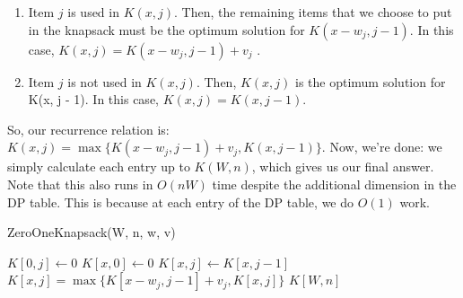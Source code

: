 \documentclass [12pt]{article}
\theoremstyle{definition}
\begin{document}
\begin{enumerate}
  \item Item $j$ is used in $K(x, j)$. Then, the remaining items that we choose to put in the knapsack must be the optimum solution for $K(x - w_j , j - 1)$. In this case, $K(x, j) = K(x - w_j , j - 1) + v_j$ .
  \item Item $j$ is not used in $K(x, j)$. Then, $K(x, j)$ is the optimum solution for K(x, j - 1). In this case, $K(x, j) = K(x, j - 1)$.
\end{enumerate}

So, our recurrence relation is: $K(x, j) = \max\{K(x -w_j , j -1) +v_j , K(x, j -1)\}$. Now, we’re done: we simply calculate each entry up to $K(W, n)$, which gives us our final answer. Note that this also runs in $O(nW)$ time despite the additional dimension in the DP table. This is because at each entry of the DP table, we do $O(1)$ work.

\begin{algorithm}
\caption{ZeroOneKnapsack(W, n, w, v)}
\label{alg:zerooneknapsack}
\begin{algorithmic}
  \STATE $K[0,j] \gets 0$
\ENDFOR
{}
  \STATE $K[x, 0] \gets 0$
\ENDFOR
{}
    \STATE $K[x, j] \gets K[x, j-1]$
      \STATE $K[x, j] = \max\{K[x - w_j, j-1] + v_j, K[x, j] \}$
    \ENDIF
  \ENDFOR
\ENDFOR
\RETURN $K[W, n]$
\end{algorithmic}
\end{algorithm}
\end{document}
